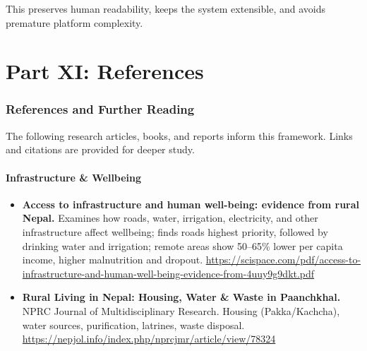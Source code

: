 \documentclass[11pt,a4paper]{article}
\begin{document}
This preserves human readability, keeps the system extensible, and avoids premature platform complexity.

\part{Part XI: References}

\section{References and Further Reading}

The following research articles, books, and reports inform this framework. Links and citations are provided for deeper study.

\subsection{Infrastructure \& Wellbeing}
\begin{itemize}
    \item \textbf{Access to infrastructure and human well-being: evidence from rural Nepal.} Examines how roads, water, irrigation, 
    electricity, and other infrastructure affect wellbeing; finds roads highest priority, followed by drinking water and irrigation; 
    remote areas show 50--65\% lower per capita income, higher malnutrition and 
    dropout. \url{https://scispace.com/pdf/access-to-infrastructure-and-human-well-being-evidence-from-4uuy9g9dkt.pdf}
    \item \textbf{Rural Living in Nepal: Housing, Water \& Waste in Paanchkhal.} NPRC Journal of Multidisciplinary Research. 
    Housing (Pakka/Kachcha), water sources, purification, latrines, waste disposal. \url{https://nepjol.info/index.php/nprcjmr/article/view/78324}
\end{itemize}
\end{document}
